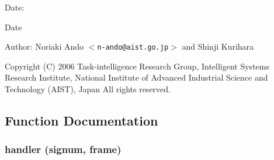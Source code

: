 \begin{Desc}
\item[Date:]\begin{Desc}
\item[Date]\end{Desc}
\end{Desc}
\begin{Desc}
\item[Author:]Noriaki Ando $<${\tt n-ando@aist.go.jp}$>$ and Shinji Kurihara\end{Desc}
Copyright (C) 2006 Task-intelligence Research Group, Intelligent Systems Research Institute, National Institute of Advanced Industrial Science and Technology (AIST), Japan All rights reserved.

\subsection{Function Documentation}
\subsubsection{\setlength{\rightskip}{0pt plus 5cm}handler (signum, frame)}\label{Manager_8py_a0}


